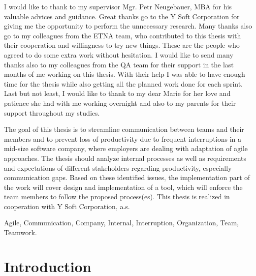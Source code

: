 \documentclass[11pt,singleside]{myfithesis2}
\begin{document}
\FrontMatter
\ThesisTitlePage
\begin{ThesisDeclaration}
\DeclarationText
\AdvisorName
\end{ThesisDeclaration}
\begin{ThesisThanks}
I would like to thank to my supervisor Mgr. Petr Neugebauer, MBA for his valuable advices and guidance. Great thanks go to the Y Soft Corporation for giving me the opportunity to perform the unnecessary research. Many thanks also go to my colleagues from the ETNA team, who contributed to this thesis with their cooperation and willingness to try new things. These are the people who agreed to do some extra work without hesitation. I would like to send many thanks also to my colleagues from the QA team for their support in the last months of me working on this thesis. With their help I was able to have enough time for the thesis while also getting all the planned work done for each sprint. Last but not least, I would like to thank to my dear Marie for her love and patience she had with me working overnight and also to my parents for their support throughout my studies. 
\end{ThesisThanks}
\begin{ThesisAbstract}
The goal of this thesis is to streamline communication between teams and their members and to prevent loss of productivity due to frequent interruptions in a mid-size software company, where employers are dealing with adaptation of agile approaches. The thesis should analyze internal processes as well as requirements and expectations of different stakeholders regarding productivity, especially communication gaps. Based on these identified issues, the implementation part of the work will cover design and implementation of a tool, which will enforce the team members to follow the proposed process(es). This thesis is realized in cooperation with Y Soft Corporation, a.s.
\end{ThesisAbstract}
\begin{ThesisKeyWords}
Agile, Communication, Company, Internal, Interruption, Organization, Team, Teamwork.
\end{ThesisKeyWords}
\MainMatter
\tableofcontents %

\chapter{Introduction}
\end{document}

